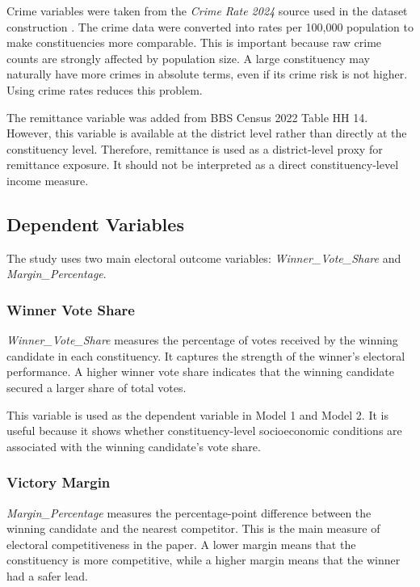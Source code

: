 \documentclass[12pt,a4paper]{article}
\begin{document}
Crime variables were taken from the \textit{Crime Rate 2024} source used in the dataset construction \citep{crime2024}. The crime data were converted into rates per 100,000 population to make constituencies more comparable. This is important because raw crime counts are strongly affected by population size. A large constituency may naturally have more crimes in absolute terms, even if its crime risk is not higher. Using crime rates reduces this problem.

The remittance variable was added from BBS Census 2022 Table HH 14. However, this variable is available at the district level rather than directly at the constituency level. Therefore, remittance is used as a district-level proxy for remittance exposure. It should not be interpreted as a direct constituency-level income measure.

\subsection{Dependent Variables}

The study uses two main electoral outcome variables: \textit{Winner\_Vote\_Share} and \textit{Margin\_Percentage}.

\subsubsection{Winner Vote Share}

\textit{Winner\_Vote\_Share} measures the percentage of votes received by the winning candidate in each constituency. It captures the strength of the winner's electoral performance. A higher winner vote share indicates that the winning candidate secured a larger share of total votes.

This variable is used as the dependent variable in Model 1 and Model 2. It is useful because it shows whether constituency-level socioeconomic conditions are associated with the winning candidate's vote share.

\subsubsection{Victory Margin}

\textit{Margin\_Percentage} measures the percentage-point difference between the winning candidate and the nearest competitor. This is the main measure of electoral competitiveness in the paper. A lower margin means that the constituency is more competitive, while a higher margin means that the winner had a safer lead.
\end{document}
